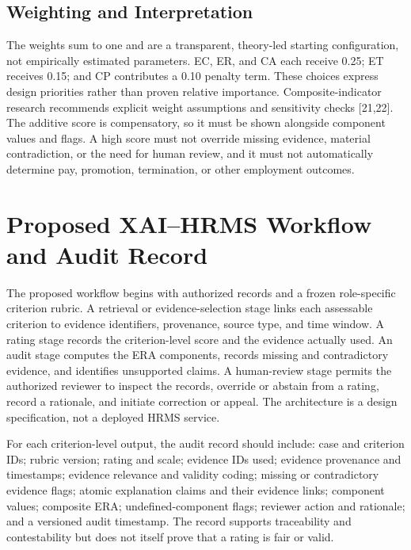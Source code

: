 \documentclass[
  10pt,
  runningheads]{llncs}
\begin{document}
\subsection{Weighting and
Interpretation}\label{weighting-and-interpretation}

The weights sum to one and are a transparent, theory-led starting
configuration, not empirically estimated parameters. EC, ER, and CA each
receive 0.25; ET receives 0.15; and CP contributes a 0.10 penalty term.
These choices express design priorities rather than proven relative
importance. Composite-indicator research recommends explicit weight
assumptions and sensitivity checks {[}21,22{]}. The additive score is
compensatory, so it must be shown alongside component values and flags.
A high score must not override missing evidence, material contradiction,
or the need for human review, and it must not automatically determine
pay, promotion, termination, or other employment outcomes.

\section{Proposed XAI--HRMS Workflow and Audit
Record}\label{proposed-xaihrms-workflow-and-audit-record}

The proposed workflow begins with authorized records and a frozen
role-specific criterion rubric. A retrieval or evidence-selection stage
links each assessable criterion to evidence identifiers, provenance,
source type, and time window. A rating stage records the criterion-level
score and the evidence actually used. An audit stage computes the ERA
components, records missing and contradictory evidence, and identifies
unsupported claims. A human-review stage permits the authorized reviewer
to inspect the records, override or abstain from a rating, record a
rationale, and initiate correction or appeal. The architecture is a
design specification, not a deployed HRMS service.

For each criterion-level output, the audit record should include: case
and criterion IDs; rubric version; rating and scale; evidence IDs used;
evidence provenance and timestamps; evidence relevance and validity
coding; missing or contradictory evidence flags; atomic explanation
claims and their evidence links; component values; composite ERA;
undefined-component flags; reviewer action and rationale; and a
versioned audit timestamp. The record supports traceability and
contestability but does not itself prove that a rating is fair or valid.
\end{document}

